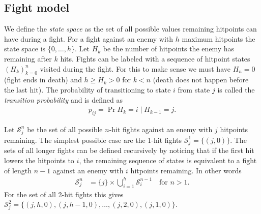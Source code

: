 \subsection{Fight model}\label{chap:fightDef}
We define the \textit{state space} as the set of all possible values remaining hitpoints can have during a fight. For a fight against an enemy with $h$ maximum hitpoints the state space is $\{0,\ldots,h\}$. Let $H_k$ be the number of hitpoints the enemy has remaining after $k$ hits. Fights can be labeled with a sequence of hitpoint states $(H_k)_{k=0}^{n}$ visited during the fight. For this to make sense we must have $H_n=0$ (fight ends in death) and $h \geq H_k > 0$ for $k<n$ (death does not happen before the last hit).
The probability of transitioning to state $i$ from state $j$ is called the \textit{transition probability} and is defined as
\begin{align}\label{eq:transitionProbabilities}
    p_{ij} = \Pr{H_k = i \mid H_{k-1} = j}.
\end{align}

Let $\mathcal{S}_j^n$ be the set of all possible $n$-hit fights against an enemy with $j$ hitpoints remaining. The simplest possible case are the 1-hit fights $\mathcal{S}_j^1 = \{(j,0)\}$. The sets of all longer fights can be defined recursively by noticing that if the first hit lowers the hitpoints to $i$, the remaining sequence of states is equivalent to a fight of length $n-1$ against an enemy with $i$ hitpoints remaining. In other words
\begin{align}
	\mathcal{S}_j^n &=  \{j\} \times \bigcup_{i=1}^h \mathcal{S}_i^{n-1} \quad \mbox{for } n>1.\label{eq:fightRecursion}
\end{align}
For the set of all 2-hit fights this gives $\mathcal{S}_j^2 = \{(j,h,0), (j,h-1,0), \ldots, (j,2,0), (j,1,0)\}$.

